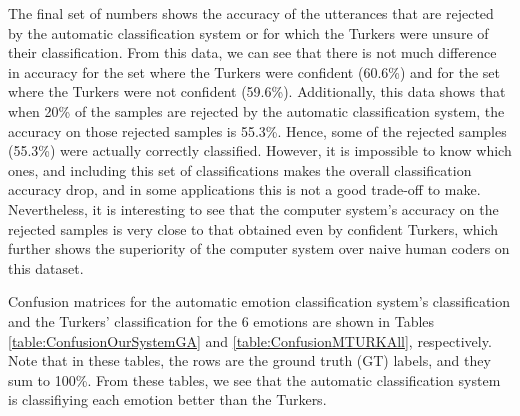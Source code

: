 \documentclass{article}
\begin{document}
The final set of numbers shows the accuracy of the utterances that are rejected by the automatic classification system or for which the Turkers were unsure of their classification.  From this data, we can see that there is not much difference in accuracy for the set where the Turkers were confident (60.6\%) and for the set where the Turkers were not confident (59.6\%).  Additionally, this data shows that when 20\% of the samples are rejected by the automatic classification system, the accuracy on those rejected samples is 55.3\%. Hence, some of the rejected samples (55.3\%) were actually correctly classified.  However, it is impossible to know which ones, and including this set of classifications makes the overall classification accuracy drop, and in some applications this is not a good trade-off to make. Nevertheless, it is interesting to see that the computer system's accuracy on the rejected samples is very close to that obtained even by confident Turkers, which further shows the superiority of the computer system over naive human coders on this dataset. \par
Confusion matrices for the automatic emotion classification system's classification and the Turkers' classification for the 6 emotions are shown in Tables \ref{table:ConfusionOurSystemGA} and \ref{table:ConfusionMTURKAll}, respectively. Note that in these tables, the rows are the ground truth (GT) labels, and they sum to 100\%. From these tables, we see that the automatic classification system is classifiying each emotion better than the Turkers.
\end{document}
